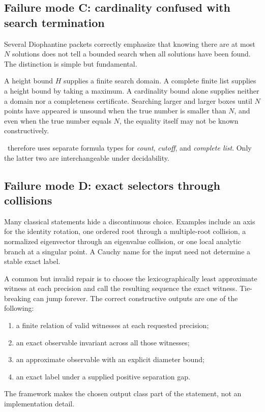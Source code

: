\subsection{Failure mode C: cardinality confused with search termination}

Several Diophantine packets correctly emphasize that knowing there are at most \(N\) solutions does not tell a bounded search when all solutions have been found.  The distinction is simple but fundamental.

A height bound \(H\) supplies a finite search domain.  A complete finite list supplies a height bound by taking a maximum.  A cardinality bound alone supplies neither a domain nor a completeness certificate.  Searching larger and larger boxes until \(N\) points have appeared is unsound when the true number is smaller than \(N\), and even when the true number equals \(N\), the equality itself may not be known constructively.

\CIFER\ therefore uses separate formula types for \emph{count}, \emph{cutoff}, and \emph{complete list}.  Only the latter two are interchangeable under decidability.

\subsection{Failure mode D: exact selectors through collisions}

Many classical statements hide a discontinuous choice.  Examples include an axis for the identity rotation, one ordered root through a multiple-root collision, a normalized eigenvector through an eigenvalue collision, or one local analytic branch at a singular point.  A Cauchy name for the input need not determine a stable exact label.

A common but invalid repair is to choose the lexicographically least approximate witness at each precision and call the resulting sequence the exact witness.  Tie-breaking can jump forever.  The correct constructive outputs are one of the following:
\begin{enumerate}
\item a finite relation of valid witnesses at each requested precision;
\item an exact observable invariant across all those witnesses;
\item an approximate observable with an explicit diameter bound;
\item an exact label under a supplied positive separation gap.
\end{enumerate}
The framework makes the chosen output class part of the statement, not an implementation detail.

